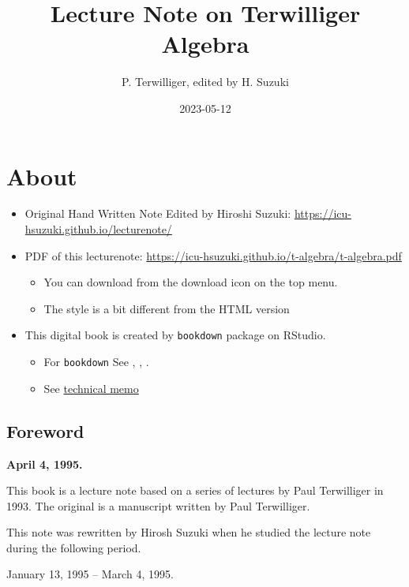 \documentclass[
]{book}
\title{Lecture Note on Terwilliger Algebra}
\author{P. Terwilliger, edited by H. Suzuki}
\date{2023-05-12}
\providecommand{\tightlist}{%
  \setlength{\itemsep}{0pt}\setlength{\parskip}{0pt}}
\theoremstyle{definition}
\theoremstyle{definition}
\theoremstyle{definition}
\theoremstyle{definition}
\theoremstyle{remark}
\begin{document}
\maketitle

{
\setcounter{tocdepth}{1}
\tableofcontents
}
\hypertarget{about}{%
\chapter*{About}\label{about}}

\begin{itemize}
\tightlist
\item
  Original Hand Written Note Edited by Hiroshi Suzuki: \url{https://icu-hsuzuki.github.io/lecturenote/}
\item
  PDF of this lecturenote: \url{https://icu-hsuzuki.github.io/t-algebra/t-algebra.pdf}

  \begin{itemize}
  \tightlist
  \item
    You can download from the download icon on the top menu.
  \item
    The style is a bit different from the HTML version
  \end{itemize}
\item
  This digital book is created by \texttt{bookdown} package on RStudio.

  \begin{itemize}
  \tightlist
  \item
    For \texttt{bookdown} See \citep{xie2015}, \citep{xie2017}, \citep{xie2018}.
  \item
    See \protect\hyperlink{memo}{technical memo}
  \end{itemize}
\end{itemize}

\hypertarget{foreword}{%
\section*{Foreword}\label{foreword}}

\textbf{April 4, 1995.}

This book is a lecture note based on a series of lectures by Paul Terwilliger in 1993. The original is a manuscript written by Paul Terwilliger.

This note was rewritten by Hirosh Suzuki when he studied the lecture note during the following period.

January 13, 1995 -- March 4, 1995.
\end{document}
